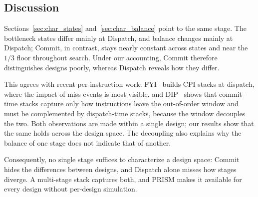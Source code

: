 
\subsection{Discussion}
\label{sec:char_discussion}

Sections~\ref{sec:char_states} and~\ref{sec:char_balance} point to the same stage.
%
The bottleneck states differ mainly at Dispatch, and balance changes mainly at Dispatch; Commit, in contrast, stays nearly constant across states and near the $1/3$ floor throughout search.
%
Under our accounting, Commit therefore distinguishes designs poorly, whereas Dispatch reveals how they differ.

This agrees with recent per-instruction work.
%
FYI~\cite{fyi} builds CPI stacks at dispatch, where the impact of miss events is most visible, and DIP~\cite{dip} shows that commit-time stacks capture only how instructions leave the out-of-order window and must be complemented by dispatch-time stacks, because the window decouples the two.
%
Both observations are made within a single design; our results show that the same holds across the design space.
%
The decoupling also explains why the balance of one stage does not indicate that of another.

Consequently, no single stage suffices to characterize a design space: Commit hides the differences between designs, and Dispatch alone misses how stages diverge.
%
A multi-stage stack captures both, and PRISM makes it available for every design without per-design simulation.
